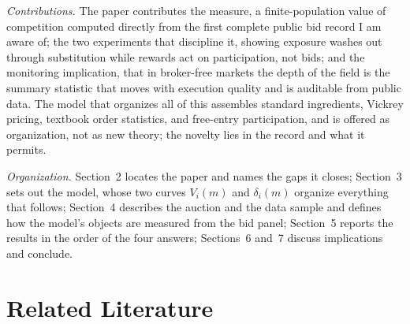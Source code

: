 \documentclass[11pt]{article}
\theoremstyle{plain}
\theoremstyle{definition}
\theoremstyle{remark}
\begin{document}
\emph{Contributions.} The paper contributes the measure, a finite-population value of competition computed directly from the first complete public bid record I am aware of; the two experiments that discipline it, showing exposure washes out through substitution while rewards act on participation, not bids; and the monitoring implication, that in broker-free markets the depth of the field is the summary statistic that moves with execution quality and is auditable from public data. The model that organizes all of this assembles standard ingredients, Vickrey pricing, textbook order statistics, and free-entry participation, and is offered as organization, not as new theory; the novelty lies in the record and what it permits.

\emph{Organization.} Section~2 locates the paper and names the gaps it closes; Section~3 sets out the model, whose two curves $V_i(m)$ and $\delta_i(m)$ organize everything that follows; Section~4 describes the auction and the data sample and defines how the model's objects are measured from the bid panel; Section~5 reports the results in the order of the four answers; Sections~6 and~7 discuss implications and conclude.

\section{Related Literature}
\end{document}
